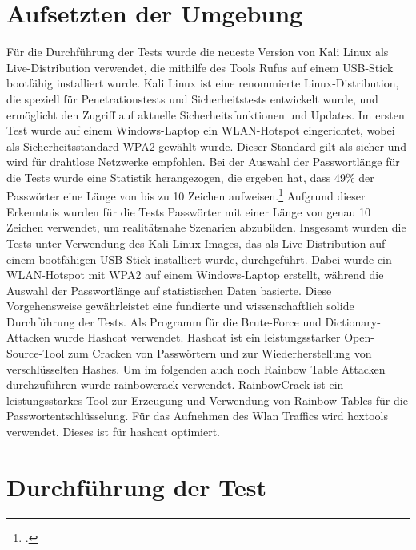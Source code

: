 \section{Aufsetzten der Umgebung}
Für die Durchführung der Tests wurde die neueste Version von Kali Linux als Live-Distribution verwendet, die mithilfe des Tools Rufus auf einem USB-Stick bootfähig installiert wurde. 
Kali Linux ist eine renommierte Linux-Distribution, die speziell für Penetrationstests und Sicherheitstests entwickelt wurde, und ermöglicht den Zugriff auf aktuelle Sicherheitsfunktionen und Updates.
Im ersten Test wurde auf einem Windows-Laptop ein WLAN-Hotspot eingerichtet, wobei als Sicherheitsstandard WPA2 gewählt wurde. 
Dieser Standard gilt als sicher und wird für drahtlose Netzwerke empfohlen.
Bei der Auswahl der Passwortlänge für die Tests wurde eine Statistik herangezogen, die ergeben hat, dass 49\% der Passwörter eine Länge von bis zu 10 Zeichen aufweisen.\footcite[Vgl]{statistalaenge} 
Aufgrund dieser Erkenntnis wurden für die Tests Passwörter mit einer Länge von genau 10 Zeichen verwendet, um realitätsnahe Szenarien abzubilden.
Insgesamt wurden die Tests unter Verwendung des Kali Linux-Images, das als Live-Distribution auf einem bootfähigen USB-Stick installiert wurde, durchgeführt. 
Dabei wurde ein WLAN-Hotspot mit WPA2 auf einem Windows-Laptop erstellt, während die Auswahl der Passwortlänge auf statistischen Daten basierte. Diese Vorgehensweise gewährleistet eine fundierte und wissenschaftlich solide Durchführung der Tests.
Als Programm für die Brute-Force und Dictionary-Attacken wurde Hashcat verwendet. Hashcat ist ein leistungsstarker Open-Source-Tool zum Cracken von Passwörtern und zur Wiederherstellung von verschlüsselten Hashes. 
Um im folgenden auch noch Rainbow Table Attacken durchzuführen wurde rainbowcrack verwendet. RainbowCrack ist ein leistungsstarkes Tool zur Erzeugung und Verwendung von Rainbow Tables für die Passwortentschlüsselung.
Für das Aufnehmen des Wlan Traffics wird hcxtools verwendet. Dieses ist für hashcat optimiert. 
\section{Durchführung der Test}

 
